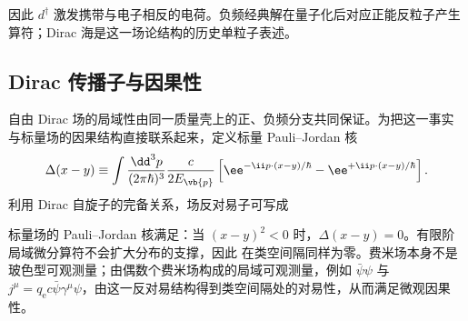因此 $d^\dagger$ 激发携带与电子相反的电荷。负频经典解在量子化后对应正能反粒子产生算符；Dirac 海是这一场论结构的历史单粒子表述。

\subsection{Dirac 传播子与因果性}

\begin{proposition}
自由 Dirac 场的局域性由同一质量壳上的正、负频分支共同保证。为把这一事实与标量场的因果结构直接联系起来，定义标量 Pauli--Jordan 核
\begin{equation*}
 \Delta(x-y)
 \equiv
 \int\frac{\dd^3 p}{(2\pi\hbar)^3}\frac{c}{2E_{\vb{p}}}
 \left[
 \ee^{-\ii p\cdot(x-y)/\hbar}
 -\ee^{+\ii p\cdot(x-y)/\hbar}
 \right].
\end{equation*}
利用 Dirac 自旋子的完备关系，场反对易子可写成

标量场的 Pauli--Jordan 核满足：当 $(x-y)^2<0$ 时，$\Delta(x-y)=0$。有限阶局域微分算符不会扩大分布的支撑，因此 在类空间隔同样为零。费米场本身不是玻色型可观测量；由偶数个费米场构成的局域可观测量，例如 $\bar\psi\psi$ 与 $j^\mu=q_{\mathrm e} c\bar\psi\gamma^\mu\psi$，由这一反对易结构得到类空间隔处的对易性，从而满足微观因果性。

\end{proposition}

